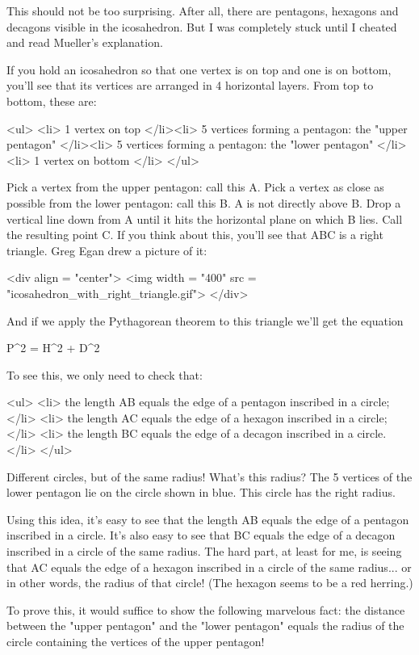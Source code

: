 This should not be too surprising.  After all, there are pentagons, 
hexagons and decagons visible in the icosahedron.  But I was completely
stuck until I cheated and read Mueller's explanation.

If you hold an icosahedron so that one vertex is on top and one is
on bottom, you'll see that its vertices are arranged in 4 horizontal
layers.  From top to bottom, these are:

<ul>
<li>
1 vertex on top
</li><li>
5 vertices forming a pentagon: the "upper pentagon"
</li><li>
5 vertices forming a pentagon: the "lower pentagon"
</li><li>
1 vertex on bottom
</li>
</ul>

Pick a vertex from the upper pentagon: call this A.  Pick a vertex 
as close as possible from the lower pentagon: call this B.  A is not 
directly above B.  Drop a vertical line down from A until it hits the 
horizontal plane on which B lies.  Call the resulting point C.  
If you think about this, you'll see that ABC is a right triangle.  
Greg Egan drew a picture of it:

<div align = "center">
<img width = "400" src = "icosahedron_with_right_triangle.gif">
</div>

And if we apply the Pythagorean theorem to 
this triangle we'll get the equation

P^{2} = H^{2} + D^{2}

To see this, we only need to check that:

<ul>
<li>
the length AB equals the edge of a pentagon inscribed in a circle;
</li>
<li>
the length AC equals the edge of a hexagon inscribed in a circle;
</li>
<li>
the length BC equals the edge of a decagon inscribed in a circle.
</li>
</ul>

Different circles, but of the same radius!  What's this radius?  The 5
vertices of the lower pentagon lie on the circle shown in
blue.  This circle has the right radius.

Using this idea, it's easy to see that the length AB equals the edge
of a pentagon inscribed in a circle.  It's also easy to see that 
BC equals the edge of a decagon inscribed in a circle of the same
radius.  The hard part, at least for me, is seeing that AC equals the 
edge of a hexagon inscribed in a circle of the same radius... or in 
other words, the radius of that circle!  (The hexagon seems to be a
red herring.)

To prove this, it would suffice to show the following marvelous fact:
the distance between the "upper pentagon" and the
"lower pentagon" equals the radius of the circle containing
the vertices of the upper pentagon!

